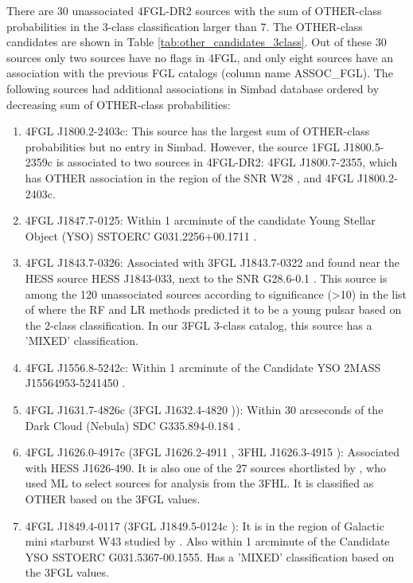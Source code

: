 There are 30 unassociated 4FGL-DR2 sources
with the sum of OTHER-class probabilities in the 3-class classification larger than 7.
The OTHER-class candidates are shown in Table \ref{tab:other_candidates_3class}. 
Out of these 30 sources only two sources have no flags in 4FGL, and only eight sources have an association with the previous FGL catalogs (column name ASSOC\_FGL). 
The following sources had additional associations in Simbad database
ordered by decreasing sum of OTHER-class probabilities:
\begin{enumerate}
\item 4FGL J1800.2-2403c: This source has the largest sum of OTHER-class probabilities but no entry in Simbad. 
However, the source 1FGL J1800.5-2359c \citep{2010ApJS..188..405A} is associated to two sources in 4FGL-DR2:
4FGL J1800.7-2355, which has OTHER association in the region of the SNR W28 \citep{2020MNRAS.495.2909R}, and 4FGL J1800.2-2403c.
\item 4FGL J1847.7-0125: Within 1 arcminute of the candidate Young Stellar Object (YSO) SSTOERC G031.2256+00.1711 \citep{2017ApJ...839..108S}.
\item 4FGL J1843.7-0326: Associated with 3FGL J1843.7-0322 and found near the HESS source HESS J1843-033, next to the SNR G28.6-0.1 \citep{2018A&A...612A...1H}. This source is
among the 120 unassociated sources according to significance (>10) in the list of \citet{2016ApJ...820....8S} where the RF and LR methods predicted it to be a young pulsar based on the 2-class classification. 
In our 3FGL 3-class catalog, this source has a 'MIXED' classification.
\item 4FGL J1556.8-5242c: Within 1 arcminute of the Candidate YSO 2MASS J15564953-5241450 \citep{2008AJ....136.2413R}.
\item 4FGL J1631.7-4826c (3FGL J1632.4-4820 \citep{2015ApJS..218...23A})): Within 30 arcseconds of the Dark Cloud (Nebula) SDC G335.894-0.184 \citep{2016A&A...590A..72P}.
\item 4FGL J1626.0-4917c (3FGL J1626.2-4911 \citep{2015ApJS..218...23A}, 3FHL J1626.3-4915 \citep{2017ApJS..232...18A}): 
Associated with HESS J1626-490. It is also one of the 27 sources shortlisted by \citet{2020MNRAS.495.1093H}, 
who used ML to select sources for analysis from the 3FHL. It is classified as OTHER based on the 3FGL values.
\item 4FGL J1849.4-0117 (3FGL J1849.5-0124c \citep{2015ApJS..218...23A}): It is in the region of Galactic mini starburst W43 studied by \citet{2020A&A...640A..60Y}. Also within 1 arcminute of the Candidate YSO SSTOERC G031.5367-00.1555. Has a 'MIXED' classification based on the 3FGL values.

\end{enumerate}
